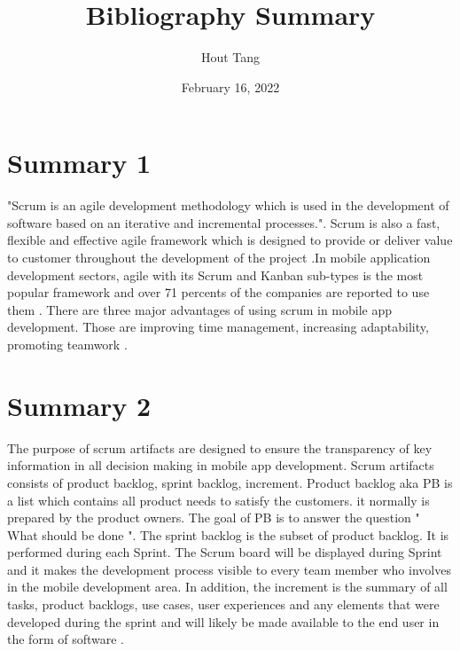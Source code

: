 \documentclass{article}
\title{Bibliography Summary}
\author{Hout Tang}
\date{February 16, 2022}
\begin{document}
\maketitle

\section*{Summary 1}
"Scrum is an agile development methodology which is used in the development of software based on an iterative and incremental processes."\cite{digiteArticle}. Scrum is also a fast, flexible and effective agile framework which is designed to provide or deliver value to customer throughout the development of the project \cite{digiteArticle}.In mobile application development sectors, agile with its Scrum and Kanban sub-types is the most popular framework and over 71 percents of the companies are reported to use them \cite{olgaArticle}. There are three major advantages of using scrum in mobile app development. Those are improving time management, increasing adaptability, promoting teamwork \cite{olgaArticle}.

\medskip

\section*{Summary 2}

The purpose of scrum artifacts are designed to ensure the transparency of key information in all decision making in mobile app development. Scrum artifacts consists of product backlog, sprint backlog, increment. Product backlog aka PB is a list which contains all product needs to satisfy the customers. it normally is prepared by the product owners. The goal of PB is to answer the question " What should be done "\cite{digiteArticle}. The sprint backlog is the subset of product backlog. It is performed during each Sprint. The Scrum board will be displayed during Sprint and it makes the development process visible to every team member who involves in the mobile development area. In addition, the increment is the summary of all tasks, product backlogs, use cases, user experiences and any elements that were developed during the sprint and will likely be made available to the end user in the form of software \cite{srivastava2017scrum}.




\printbibliography
\end{document}
